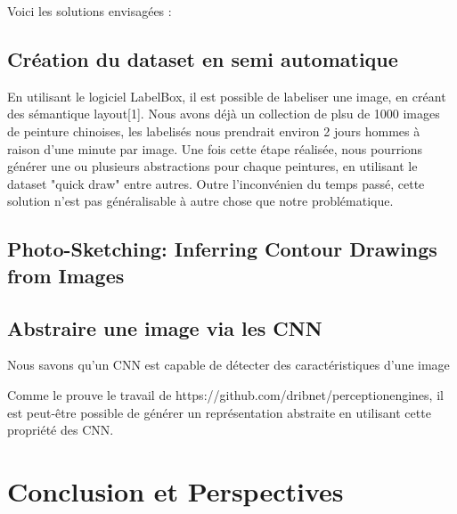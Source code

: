 \documentclass[a4paper, 12pt]{book}
\begin{document}
Voici les solutions envisagées  :

\section{Création du dataset en semi automatique}

En utilisant le logiciel LabelBox, il est possible de labeliser une image, en créant des sémantique layout[1]. Nous avons déjà un collection de plsu de 1000 images de peinture chinoises, les labelisés nous prendrait environ 2 jours hommes à raison d'une minute par image. Une fois cette étape réalisée, nous pourrions générer une ou plusieurs abstractions pour chaque peintures, en utilisant le dataset "quick draw" entre autres. Outre l'inconvénien du temps passé, cette solution n'est pas généralisable à autre chose que notre problématique.

\section{Photo-Sketching: Inferring Contour Drawings from Images}


\section{Abstraire une image via les CNN}
Nous savons qu'un CNN est capable de détecter des caractéristiques d'une image


Comme le prouve le travail de https://github.com/dribnet/perceptionengines, il est peut-être possible de générer un représentation abstraite en utilisant cette propriété des CNN.


\chapter{Conclusion et Perspectives\label{chap-conclusion}}



\end{document}
